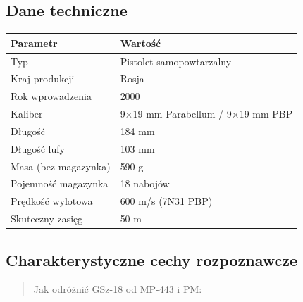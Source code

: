 \documentclass[12pt,oneside]{book}
\begin{document}
\subsection{Dane techniczne}\label{dane-techniczne-107}

\begin{longtable}[]{@{}ll@{}}
\toprule\noalign{}
Parametr & Wartość \\
\midrule\noalign{}
\endhead
\bottomrule\noalign{}
\endlastfoot
Typ & Pistolet samopowtarzalny \\
Kraj produkcji & Rosja \\
Rok wprowadzenia & 2000 \\
Kaliber & 9×19 mm Parabellum / 9×19 mm PBP \\
Długość & 184 mm \\
Długość lufy & 103 mm \\
Masa (bez magazynka) & 590 g \\
Pojemność magazynka & 18 nabojów \\
Prędkość wylotowa & 600 m/s (7N31 PBP) \\
Skuteczny zasięg & 50 m \\
\end{longtable}

\subsection{Charakterystyczne cechy
rozpoznawcze}\label{charakterystyczne-cechy-rozpoznawcze-107}

\begin{quote}
Jak odróżnić GSz-18 od MP-443 i PM:
\end{quote}
\end{document}
